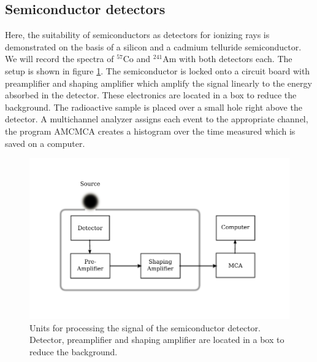 \subsection{Semiconductor detectors}
Here, the suitability of semiconductors as detectors for 
ionizing rays is demonstrated on the basis of a silicon 
and a cadmium telluride semiconductor. We will record 
the spectra of $^{57}$Co and $^{241}$Am with both detectors 
each. 
The setup is shown in figure \ref{fig:setup_detector}.
The semiconductor is
locked onto a circuit board with preamplifier and shaping 
amplifier which amplify the signal linearly to the energy 
absorbed in the detector. 
These electronics are located in a box to reduce the background. 
The radioactive sample is placed over a small hole right 
above the detector. 
A multichannel analyzer assigns each event to the appropriate 
channel, the program AMCMCA creates a histogram over the time measured
which is saved on a computer. 
\begin{figure}
    \includegraphics[width=\textwidth]{figures/setup_detector}
    \caption{
        Units for processing the signal of the semiconductor detector.
        Detector, preamplifier and shaping amplifier are located in 
        a box to reduce the background. 
        }
    \label{fig:setup_detector}
\end{figure}


